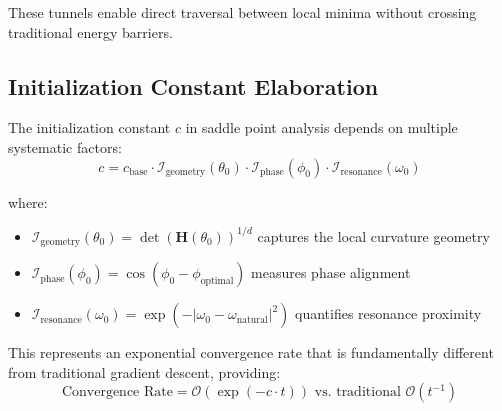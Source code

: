 These tunnels enable direct traversal between local minima without crossing traditional energy barriers.

\subsection{Initialization Constant Elaboration}

The initialization constant $c$ in saddle point analysis depends on multiple systematic factors:
\begin{equation}
c = c_{\text{base}} \cdot \mathcal{I}_{\text{geometry}}(\theta_0) \cdot \mathcal{I}_{\text{phase}}(\phi_0) \cdot \mathcal{I}_{\text{resonance}}(\omega_0)
\end{equation}

where:
\begin{itemize}
    \item $\mathcal{I}_{\text{geometry}}(\theta_0) = \det(\mathbf{H}(\theta_0))^{1/d}$ captures the local curvature geometry
    \item $\mathcal{I}_{\text{phase}}(\phi_0) = \cos(\phi_0 - \phi_{\text{optimal}})$ measures phase alignment
    \item $\mathcal{I}_{\text{resonance}}(\omega_0) = \exp(-|\omega_0 - \omega_{\text{natural}}|^2)$ quantifies resonance proximity
\end{itemize}

This represents an exponential convergence rate that is fundamentally different from traditional gradient descent, providing:
\begin{equation}
\text{Convergence Rate} = \mathcal{O}(\exp(-c \cdot t)) \text{ vs. traditional } \mathcal{O}(t^{-1})
\end{equation}